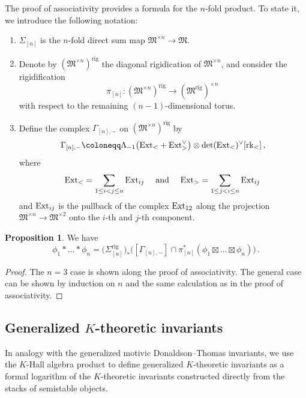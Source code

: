 \documentclass[12pt]{amsart}
\theoremstyle{definition}
\newtheorem{proposition}[definition]{Proposition}
\newcommand{\1}{\mathbf 1}
\newcommand{\FM}{{\mathfrak{M}}}
\newcommand{\Ext}{\mathcal{E}\text{xt}}
\newcommand{\rk}{\mathrm{rk}}
\newcommand{\rig}{\mathrm{rig}}
\renewcommand{\Ext}{\textup{Ext}}
\begin{document}
The proof of associativity provides a formula for the $n$-fold product. To state it, we introduce the following notation:
\begin{enumerate}
    \item $\Sigma_{[n]}$ is the $n$-fold direct sum map $\FM^{\times n}\to \FM$.
    \item Denote by $(\FM^{\times n})^\rig$ the diagonal rigidication of $\FM^{\times n}$, and consider the rigidification 
    \[\pi_{[n]}\colon (\FM^{\times n})^\rig \to (\FM^\rig)^{\times n}\,\]
    with respect to the remaining $(n-1)$-dimensional torus.
    \item Define the complex $\Gamma_{[n], -}$ on $(\FM^{\times n})^\rig$ by
    \[\Gamma_{[n], -}\coloneqq \Lambda_{-1}\big(\Ext_{<}+\Ext_{>}^\vee\big)\otimes \det(\Ext_{<})^\vee[\rk_{<}]\,,\]
    where 
    \[\Ext_{<}=\sum_{1\leq i<j\leq n}\Ext_{ij}\quad\textup{ and }\quad\Ext_{>}=\sum_{1\leq j<i\leq n}\Ext_{ij}\,\]
    and $\Ext_{ij}$ is the pullback of the complex $\Ext_{12}$ along the projection $\FM^{\times n}\to \FM^{\times 2}$ onto the $i$-th and $j$-th component.
\end{enumerate}

\begin{proposition}\label{prop: nproduct}
    We have
\[\phi_1\ast \ldots\ast\phi_n=\big(\Sigma^\rig_{[n]}\big)_\ast\big([\Gamma_{[n], -}]\cap \pi_{[n]}^\ast (\phi_1\boxtimes \ldots\boxtimes \phi_n)\big)\,.\]
\end{proposition}
\begin{proof}
    The $n=3$ case is shown along the proof of associativity. The general case can be shown by induction on $n$ and the same calculation as in the proof of associativity.\qedhere
\end{proof}




\subsection{Generalized $K$-theoretic invariants}
\label{subsec: epsiloninvariants}
In analogy with the generalized motivic Donaldson--Thomas invariants, we use the $K$-Hall algebra product to define generalized $K$-theoretic invariants as a formal logarithm of the $K$-theoretic invariants constructed directly from the stacks of semistable objects.
\end{document}
